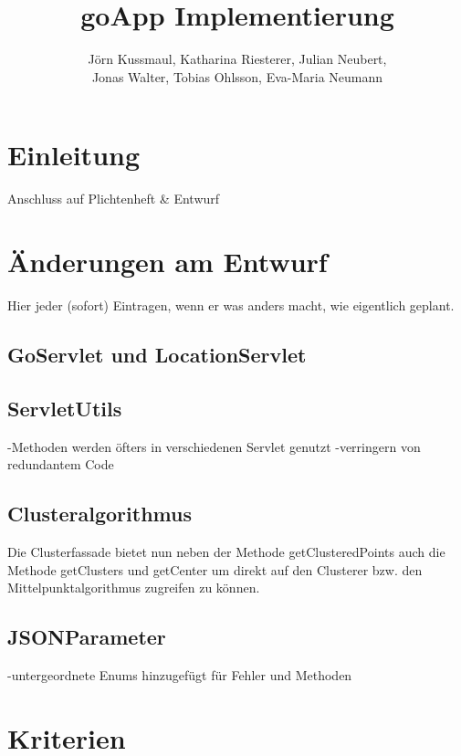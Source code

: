 \documentclass{scrartcl}
\title{goApp Implementierung}
\author{Jörn Kussmaul, Katharina Riesterer, Julian Neubert,\\ Jonas Walter, Tobias Ohlsson, Eva-Maria Neumann}
\begin{document}
	\maketitle
	\newpage
	\tableofcontents
	\newpage

	\section{Einleitung}
	Anschluss auf Plichtenheft \& Entwurf
	
	\newpage
	\section{Änderungen am Entwurf}
	Hier jeder (sofort) Eintragen, wenn er was anders macht, wie eigentlich geplant.
	
	
	\subsection{GoServlet und LocationServlet}
	
	\subsection{ServletUtils}
	-Methoden werden öfters in verschiedenen Servlet genutzt
	-verringern von redundantem Code
	
	\subsection{Clusteralgorithmus}
	Die Clusterfassade bietet nun neben der Methode getClusteredPoints auch die Methode getClusters und getCenter um direkt auf den Clusterer bzw. den Mittelpunktalgorithmus zugreifen zu können. 
	
	\subsection{JSONParameter}
	-untergeordnete Enums hinzugefügt für Fehler und Methoden
	\newpage
	\section{Kriterien}
	
\end{document}

